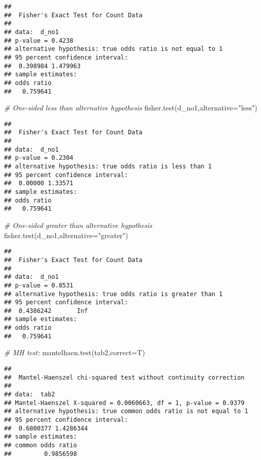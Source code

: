 \documentclass[
]{article}
\newenvironment{Shaded}{\begin{snugshade}}{\end{snugshade}}
\newcommand{\AttributeTok}[1]{\textcolor[rgb]{0.77,0.63,0.00}{#1}}
\newcommand{\CommentTok}[1]{\textcolor[rgb]{0.56,0.35,0.01}{\textit{#1}}}
\newcommand{\FunctionTok}[1]{\textcolor[rgb]{0.00,0.00,0.00}{#1}}
\newcommand{\NormalTok}[1]{#1}
\newcommand{\StringTok}[1]{\textcolor[rgb]{0.31,0.60,0.02}{#1}}
\begin{document}
\begin{verbatim}
## 
##  Fisher's Exact Test for Count Data
## 
## data:  d_no1
## p-value = 0.4238
## alternative hypothesis: true odds ratio is not equal to 1
## 95 percent confidence interval:
##  0.398984 1.479963
## sample estimates:
## odds ratio 
##   0.759641
\end{verbatim}

\begin{Shaded}
\begin{Highlighting}[]
\CommentTok{\# One{-}sided less than alternative hypothesis}
\FunctionTok{fisher.test}\NormalTok{(d\_no1,}\AttributeTok{alternative=}\StringTok{"less"}\NormalTok{)}
\end{Highlighting}
\end{Shaded}

\begin{verbatim}
## 
##  Fisher's Exact Test for Count Data
## 
## data:  d_no1
## p-value = 0.2304
## alternative hypothesis: true odds ratio is less than 1
## 95 percent confidence interval:
##  0.00000 1.33571
## sample estimates:
## odds ratio 
##   0.759641
\end{verbatim}

\begin{Shaded}
\begin{Highlighting}[]
\CommentTok{\# One{-}sided greater than alternative hypothesis}
\FunctionTok{fisher.test}\NormalTok{(d\_no1,}\AttributeTok{alternative=}\StringTok{"greater"}\NormalTok{)}
\end{Highlighting}
\end{Shaded}

\begin{verbatim}
## 
##  Fisher's Exact Test for Count Data
## 
## data:  d_no1
## p-value = 0.8531
## alternative hypothesis: true odds ratio is greater than 1
## 95 percent confidence interval:
##  0.4386242       Inf
## sample estimates:
## odds ratio 
##   0.759641
\end{verbatim}

\begin{Shaded}
\begin{Highlighting}[]
\CommentTok{\# MH test:}
\FunctionTok{mantelhaen.test}\NormalTok{(tab2,}\AttributeTok{correct=}\NormalTok{T)}
\end{Highlighting}
\end{Shaded}

\begin{verbatim}
## 
##  Mantel-Haenszel chi-squared test without continuity correction
## 
## data:  tab2
## Mantel-Haenszel X-squared = 0.0060663, df = 1, p-value = 0.9379
## alternative hypothesis: true common odds ratio is not equal to 1
## 95 percent confidence interval:
##  0.6800377 1.4286344
## sample estimates:
## common odds ratio 
##         0.9856598
\end{verbatim}
\end{document}
